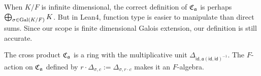\begin{remark}
  When $K/F$ is infinite dimensional, the correct definition of $\operatorname{\mathfrak{C}}_{\mathfrak{a}}$ is perhaps $\bigoplus_{\sigma\in\operatorname{Gal}(K/F)}K$. But in Lean4, function type is easier to manipulate than direct sums. Since our scope is finite dimensional Galois extension, our definition is still accurate.
\end{remark}

\begin{lemma}
  The cross product $\operatorname{\mathfrak{C}}_{\mathfrak{a}}$ is a ring with the multiplicative unit $\Delta_{\mathsf{id}, \mathfrak{a}(\mathsf{id}, \mathsf{id})^{-1}}$. The $F$-action on $\operatorname{\mathfrak{C}}_{\mathfrak{a}}$ defined by $r \cdot \Delta_{\sigma, c} := \Delta_{\sigma, r\cdot c}$ makes it an $F$-algebra.
  \leanok
\end{lemma}
